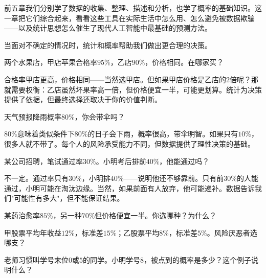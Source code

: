 
前五章我们分别学了数据的收集、整理、描述和分析，也学了概率的基础知识。这一章把它们综合起来，看看这些工具在实际生活中怎么用、怎么避免被数据欺骗——以及统计思想怎么催生了现代人工智能中最基础的预测方法。


当面对不确定的情况时，统计和概率帮助我们做出更合理的决策。

\begin{example}
两个水果店，甲店苹果合格率$95\%$，乙店$90\%$，价格相同。在哪家买？
\end{example}
\begin{solution}
合格率甲店更高，价格相同——当然选甲店。但如果甲店价格是乙店的$2$倍呢？那就需要权衡：乙店虽然坏果率高一倍，但价格便宜一半，可能更划算。统计为决策提供了依据，但最终选择还取决于你的价值判断。
\end{solution}

\begin{example}
天气预报降雨概率$80\%$，你会带伞吗？
\end{example}
\begin{solution}
$80\%$意味着类似条件下$80\%$的日子会下雨，概率很高，带伞明智。如果只有$10\%$，很多人就不带了。每个人的风险承受能力不同，但数据提供了理性决策的基础。
\end{solution}

\begin{example}
某公司招聘，笔试通过率$30\%$。小明考后排前$40\%$，他能通过吗？
\end{example}
\begin{solution}
不一定。通过率只有$30\%$，小明排$40\%$——说明他还不够靠前。只有前$30\%$的人能通过，小明可能在淘汰边缘。当然，如果前面有人放弃，他可能递补。数据告诉我们"可能性有多大"，但不能保证结果。
\end{solution}

\begin{exercise}
\item 某药治愈率$85\%$，另一种$70\%$但价格便宜一半。你选哪种？为什么？
\item 甲股票平均年收益$12\%$，标准差$15\%$；乙股票平均$8\%$，标准差$5\%$。风险厌恶者选哪支？
\item 老师习惯叫学号末位$0$或$5$的同学。小明学号$8$，被点到的概率是多少？这个例子说明什么？
\end{exercise}


